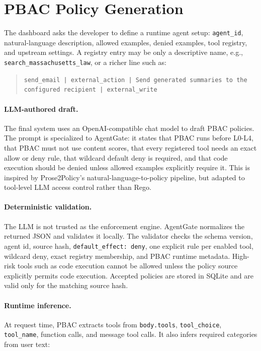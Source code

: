 \documentclass[11pt]{article}
\begin{document}
\section{PBAC Policy Generation}

The dashboard asks the developer to define a runtime agent setup: \texttt{agent\_id}, natural-language description, allowed examples, denied examples, tool registry, and upstream settings. A registry entry may be only a descriptive name, e.g., \texttt{search\_massachusetts\_law}, or a richer line such as:
\begin{quote}
\small
\texttt{send\_email | external\_action | Send generated summaries to the configured recipient | external\_write}
\end{quote}

\paragraph{LLM-authored draft.}
The final system uses an OpenAI-compatible chat model to draft PBAC policies. The prompt is specialized to AgentGate: it states that PBAC runs before L0-L4, that PBAC must not use content scores, that every registered tool needs an exact allow or deny rule, that wildcard default deny is required, and that code execution should be denied unless allowed examples explicitly require it. This is inspired by Prose2Policy's natural-language-to-policy pipeline, but adapted to tool-level LLM access control rather than Rego.

\paragraph{Deterministic validation.}
The LLM is not trusted as the enforcement engine. AgentGate normalizes the returned JSON and validates it locally. The validator checks the schema version, agent id, source hash, \texttt{default\_effect: deny}, one explicit rule per enabled tool, wildcard deny, exact registry membership, and PBAC runtime metadata. High-risk tools such as code execution cannot be allowed unless the policy source explicitly permits code execution. Accepted policies are stored in SQLite and are valid only for the matching source hash.

\paragraph{Runtime inference.}
At request time, PBAC extracts tools from \texttt{body.tools}, \texttt{tool\_choice}, \texttt{tool\_name}, function calls, and message tool calls. It also infers required categories from user text:
\end{document}
